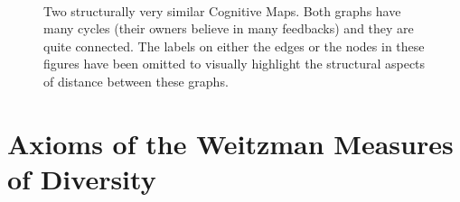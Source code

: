 \documentclass[12pt]{article}
\begin{document}
\begin{figure}
\begin{subfigure}[D]{0.7\textwidth}
                \subcaption{}
                \label{graphd}
        \end{subfigure}
        ~ %
        \caption{Two structurally very similar Cognitive Maps. Both graphs have many cycles (their owners believe in many feedbacks) and they are quite connected. The labels on either the edges or the nodes in these figures have been omitted to visually highlight the structural aspects of distance between these graphs.}\label{graphs2}
\end{figure}

\section{Axioms of the Weitzman Measures of Diversity}
\end{document}
